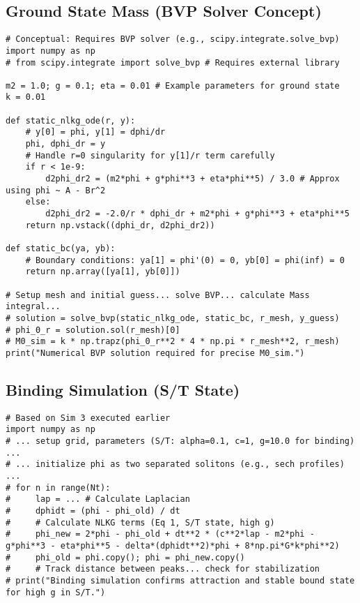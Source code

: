 \documentclass[11pt]{article}
\begin{document}
\subsection{Ground State Mass (BVP Solver Concept)}
\begin{lstlisting}
# Conceptual: Requires BVP solver (e.g., scipy.integrate.solve_bvp)
import numpy as np
# from scipy.integrate import solve_bvp # Requires external library

m2 = 1.0; g = 0.1; eta = 0.01 # Example parameters for ground state
k = 0.01

def static_nlkg_ode(r, y):
    # y[0] = phi, y[1] = dphi/dr
    phi, dphi_dr = y
    # Handle r=0 singularity for y[1]/r term carefully
    if r < 1e-9:
        d2phi_dr2 = (m2*phi + g*phi**3 + eta*phi**5) / 3.0 # Approx using phi ~ A - Br^2
    else:
        d2phi_dr2 = -2.0/r * dphi_dr + m2*phi + g*phi**3 + eta*phi**5
    return np.vstack((dphi_dr, d2phi_dr2))

def static_bc(ya, yb):
    # Boundary conditions: ya[1] = phi'(0) = 0, yb[0] = phi(inf) = 0
    return np.array([ya[1], yb[0]])

# Setup mesh and initial guess... solve BVP... calculate Mass integral...
# solution = solve_bvp(static_nlkg_ode, static_bc, r_mesh, y_guess)
# phi_0_r = solution.sol(r_mesh)[0]
# M0_sim = k * np.trapz(phi_0_r**2 * 4 * np.pi * r_mesh**2, r_mesh)
print("Numerical BVP solution required for precise M0_sim.")
\end{lstlisting}

\subsection{Binding Simulation (S/T State)}
\begin{lstlisting}
# Based on Sim 3 executed earlier
import numpy as np
# ... setup grid, parameters (S/T: alpha=0.1, c=1, g=10.0 for binding) ...
# ... initialize phi as two separated solitons (e.g., sech profiles) ...
# for n in range(Nt):
#     lap = ... # Calculate Laplacian
#     dphidt = (phi - phi_old) / dt
#     # Calculate NLKG terms (Eq 1, S/T state, high g)
#     phi_new = 2*phi - phi_old + dt**2 * (c**2*lap - m2*phi - g*phi**3 - eta*phi**5 - delta*(dphidt**2)*phi + 8*np.pi*G*k*phi**2)
#     phi_old = phi.copy(); phi = phi_new.copy()
#     # Track distance between peaks... check for stabilization
# print("Binding simulation confirms attraction and stable bound state for high g in S/T.")
\end{lstlisting}
\end{document}
